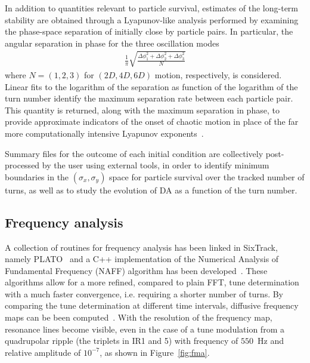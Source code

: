 \documentclass[a4paper,
              ]{jacow}
\begin{document}
In addition to quantities relevant to particle survival, estimates of the long-term stability are obtained through a Lyapunov-like analysis performed by examining the phase-space separation of initially close by particle pairs. In particular, the angular separation in phase for the three oscillation modes
\begin{align}
&\frac{1}{\pi}\sqrt{\frac{ \Delta\phi_{1}^2 + \Delta\phi_{2}^2 + \Delta\phi_{3}^2 }{N}}&\nonumber
\end{align}
where $N=(1,2,3)$ for $(2D,4D,6D)$ motion, respectively, is considered. Linear fits to the logarithm of the separation as function of the logarithm of the turn number identify the maximum separation rate between each particle pair. This quantity is returned, along with the maximum separation in phase, to provide approximate indicators of the onset of chaotic motion in place of the far more computationally intensive Lyapunov exponents~\cite{chaosproxy,distanceslope}.

Summary files for the outcome of each initial condition are collectively post-processed by the user using external tools, in order to identify minimum boundaries in the $(\sigma_{x},\sigma_{y})$ space for particle survival over the tracked number of turns, as well as to study the evolution of DA as a function of the turn number.

\subsection{Frequency analysis}

A collection of routines for frequency analysis has been linked in SixTrack, namely PLATO~\cite{plato} and a C++ implementation of the Numerical Analysis of Fundamental Frequency (NAFF) algorithm has been developed~\cite{naff}. These algorithms allow for a more refined, compared to plain FFT, tune determination with a much faster convergence, i.e. requiring a shorter number of turns. By comparing the tune determination at different time intervals,  diffusive frequency maps can be been computed~\cite{laskar}. With the resolution of the frequency map, resonance lines become visible, even in the case of a tune modulation from a quadrupolar ripple (the triplets in IR1 and 5) with frequency of $550$~Hz and relative amplitude of $10^{-7}$, as shown in Figure~\ref{fig:fma}.
\end{document}
